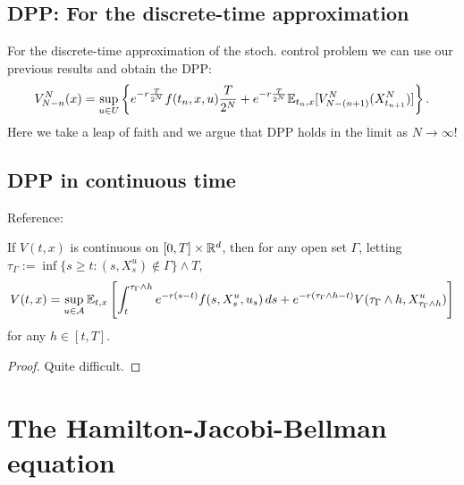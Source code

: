 \subsection{DPP: For the discrete-time approximation}

\begin{remark}
    For the discrete-time approximation of the stoch. control problem we can use our previous results and obtain the DPP:
    \[ V_{N-n}^N(x) = \sup_{u \in U} \left\{ e^{-r \frac{T}{2^N}} f(t_n, x, u) \frac{T}{2^N} + e^{-r \frac{T}{2^N}} \mathbb E_{t_n,x} [V_{N-(n+1)}^N(X_{t_{n+1}}^N)] \right\}. \]
    Here we take a leap of faith and we argue that DPP holds in the limit as $N \to \infty$!
\end{remark}

\subsection{DPP in continuous time}

\begin{remark}
    Reference: 
\end{remark}

\begin{theorem}
    If $V(t,x)$ is continuous on $[0,T] \times \mathbb R^d$, then for any open set $\Gamma$, letting $\tau_\Gamma := \inf \{ s \geq t : (s, X_s^u) \notin \Gamma \} \wedge T$,
    \[ V(t,x) = \sup_{u \in \mathcal{A}} \mathbb E_{t,x} \left[ \int_t^{\tau_\Gamma \wedge h} e^{-r(s-t)} f(s, X_s^u, u_s) \, ds + e^{-r(\tau_\Gamma \wedge h - t)} V(\tau_\Gamma \wedge h, X_{\tau_\Gamma \wedge h}^u) \right] \]
    for any $h \in [t,T]$.
\end{theorem}

\begin{proof}
    Quite difficult.
\end{proof}

\section{The Hamilton-Jacobi-Bellman equation}

